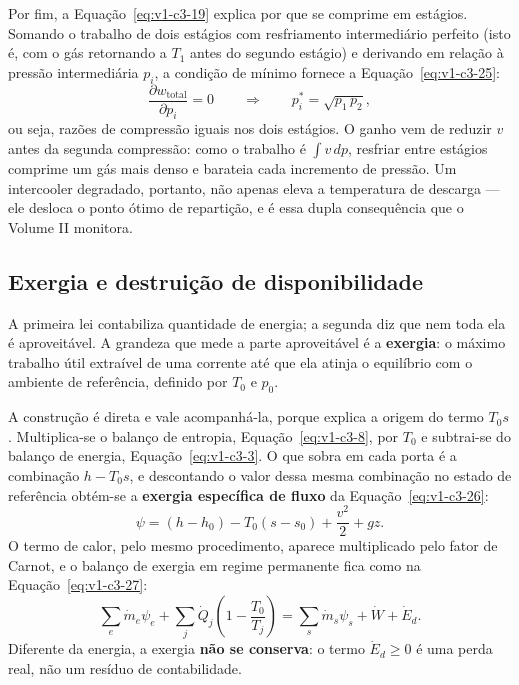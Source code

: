 \documentclass[12pt,a4paper]{article}
\numberwithin{equation}{section}
\numberwithin{table}{section}
\numberwithin{figure}{section}
\begin{document}
Por fim, a Equação~\eqref{eq:v1-c3-19} explica por que se comprime em estágios.
Somando o trabalho de dois estágios com resfriamento intermediário perfeito
(isto é, com o gás retornando a $T_1$ antes do segundo estágio) e derivando em
relação à pressão intermediária $p_i$, a condição de mínimo fornece a
Equação~\eqref{eq:v1-c3-25}:
\begin{equation}\label{eq:v1-c3-25}
\frac{\partial w_{\text{total}}}{\partial p_i} = 0
\qquad\Longrightarrow\qquad
p_i^{*} = \sqrt{p_1\,p_2},
\end{equation}
ou seja, razões de compressão iguais nos dois estágios. O ganho vem de reduzir
$v$ antes da segunda compressão: como o trabalho é $\int v\,dp$, resfriar entre
estágios comprime um gás mais denso e barateia cada incremento de pressão. Um
intercooler degradado, portanto, não apenas eleva a temperatura de descarga ---
ele desloca o ponto ótimo de repartição, e é essa dupla consequência que o
Volume II monitora.

\subsection{Exergia e destruição de disponibilidade}\label{sub:v1-c3-exergia}

A primeira lei contabiliza quantidade de energia; a segunda diz que nem toda
ela é aproveitável. A grandeza que mede a parte aproveitável é a
\textbf{exergia}: o máximo trabalho útil extraível de uma corrente até que ela
atinja o equilíbrio com o ambiente de referência, definido por $T_0$ e $p_0$.

A construção é direta e vale acompanhá-la, porque explica a origem do termo
$T_0 s$. Multiplica-se o balanço de entropia,
Equação~\eqref{eq:v1-c3-8}, por $T_0$ e subtrai-se do balanço de energia,
Equação~\eqref{eq:v1-c3-3}. O que sobra em cada porta é a combinação
$h - T_0 s$, e descontando o valor dessa mesma combinação no estado de
referência obtém-se a \textbf{exergia específica de fluxo} da
Equação~\eqref{eq:v1-c3-26}:
\begin{equation}\label{eq:v1-c3-26}
\psi = (h - h_0) - T_0 (s - s_0) + \frac{v^2}{2} + g z .
\end{equation}
O termo de calor, pelo mesmo procedimento, aparece multiplicado pelo fator de
Carnot, e o balanço de exergia em regime permanente fica como na
Equação~\eqref{eq:v1-c3-27}:
\begin{equation}\label{eq:v1-c3-27}
\sum_e \dot{m}_e \psi_e +
\sum_j \dot{Q}_j\!\left(1 - \frac{T_0}{T_j}\right) =
\sum_s \dot{m}_s \psi_s + \dot{W} + \dot{E}_d .
\end{equation}
Diferente da energia, a exergia \textbf{não se conserva}: o termo
$\dot{E}_d \ge 0$ é uma perda real, não um resíduo de contabilidade.
\end{document}
